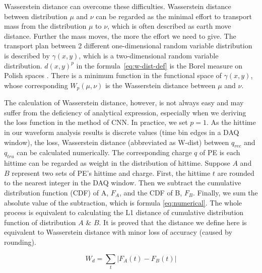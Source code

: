 Wasserstein distance can overcome these difficulties. Wasserstein distance between distribution $\mu$ and $\nu$ can be regarded as the minimal effort to transport mass from the distribution $\mu$ to $\nu$, which is often described as earth move distance. Further the mass moves, the more the effort we need to give. The transport plan between 2 different one-dimensional random variable distribution is described by $\gamma(x, y)$, which is a two-dimensional random variable distribution. $d(x,y)^{p}$ in the formula~\eqref{eq:w-dist-def} is the Borel measure on Polish spaces \cite{villani_2009}. There is a minimum function in the functional space of $\gamma(x, y)$, whose corresponding $W_{p}(\mu,\nu)$ is the Wasserstein distance between $\mu$ and $\nu$. 

The calculation of Wasserstein distance, however, is not always easy and may suffer from the deficiency of analytical expression, especially when we deriving the loss function in the method of CNN. In practice, we set $p=1$. As the hittime in our waveform analysis results is discrete values (time bin edges in a DAQ window), the loss, Wasserstein distance (abbreviated as W-dist) between $q_{rec}$ and $q_{tru}$ can be calculated numerically. The corresponding charge $q$ of PE is each hittime can be regarded as weight in the distribution of hittime. Suppose $A$ and $B$ represent two sets of PE's hittime and charge. First, the hittime $t$ are rounded to the nearest integer in the DAQ window. Then we subtract the cumulative distribution function (CDF) of A, $F_{A}$, and the CDF of B, $F_{B}$. Finally, we sum the absolute value of the subtraction, which is formula \eqref{eq:numerical}. The whole process is equivalent to calculating the L1 distance of cumulative distribution function of distribution $A$ \& $B$. It is proved that the distance we define here is equivalent to Wasserstein distance with minor loss of accuracy (caused by rounding). 

\begin{equation}
    W_{d} = \sum_t|F_{A}(t) - F_{B}(t)|
    \label{eq:numerical}
\end{equation}